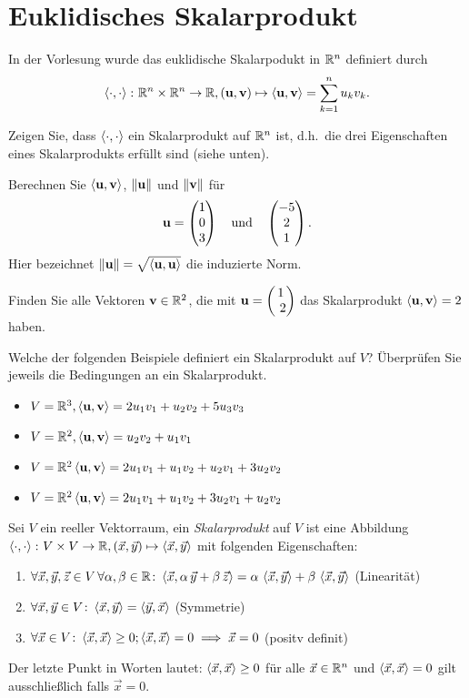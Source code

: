 \documentclass{scrartcl}
\newcommand{\xx}{\vec x}
\newcommand{\yy}{\vec y}
\newcommand{\zz}{\vec z}
\newcommand{\uu}{\mat u}
\newcommand{\vv}{\mat v}
\begin{document}
\section{Euklidisches Skalarprodukt}
In der Vorlesung wurde das euklidische Skalarpodukt in $\RR^n$ definiert durch
\[
  \sp{\cdot}{\cdot} \colon \RR^n \times \RR^n \to \RR, (\uu, \vv) \mapsto \sp{\uu}{\vv} = \sum_{k=1}^n u_k v_k.
\]
\begin{subex}
  \item Zeigen Sie, dass $\sp{\cdot}{\cdot}$ ein Skalarprodukt auf $\RR^n$ ist, d.h.\ die drei Eigenschaften eines Skalarprodukts erfüllt sind (siehe unten).
  \item Berechnen Sie $\sp{\uu}{\vv}$, $\norm{\uu}$ und $\norm{\vv}$ für 
  \[
    \uu = \colvec{1 \\ 0 \\ 3} \quad\mbox{und}\quad \colvec{-5 \\ 2 \\ 1}.
  \]
  Hier bezeichnet $\norm{\uu} = \sqrt{\sp{\uu}{\uu}}$ die induzierte Norm.
  \item Finden Sie alle Vektoren $\vv \in \RR^2$, die mit $\uu = \colvec{1 \\ 2}$ das Skalarprodukt $\sp{\uu}{\vv} = 2$ haben.  
  \item Welche der folgenden Beispiele definiert ein Skalarprodukt auf $V$?
  Überprüfen Sie jeweils die Bedingungen an ein Skalarprodukt.
  \begin{itemize}
    \item $V = \RR^3, \sp{\uu}{\vv} = 2u_1 v_1 +u_2 v_2 +5u_3 v_3$
    \item $V = \RR^2, \sp{\uu}{\vv} = u_2 v_2 + u_1 v_1$
    \item $V =\RR^2 \sp{\uu}{\vv} = 2u_1 v_1 + u_1 v_2 + u_2 v_1 + 3u_2 v_2$
    \item $V =\RR^2 \sp{\uu}{\vv} = 2u_1 v_1 + u_1 v_2 + 3u_2 v_1 + u_2 v_2$
  \end{itemize}
\end{subex}


\begin{solution}[Defintionen]
  Sei $V$ ein reeller Vektorraum, ein \emph{Skalarprodukt} auf $V$ ist eine Abbildung $\sp{\cdot}{\cdot}\colon V \times V \to \RR, (\xx,\yy) \mapsto \sp{\xx}{\yy}$ mit folgenden Eigenschaften:
  \begin{enumerate}[label=\roman*)]
    \item $\forall \xx,\yy,\zz \in V \, \forall \alpha,\beta \in \RR\colon \sp{\xx}{\alpha \, \yy + \beta \, \zz} = \alpha\,\sp{\xx}{\yy} + \beta\,\sp{\xx}{\yy}$ (Linearität)
    \item $\forall \xx,\yy \in V\colon \sp{\xx}{\yy} = \sp{\yy}{\xx}$ (Symmetrie)
    \item $\forall \xx \in V\colon \sp{\xx}{\xx} \ge 0; \sp{\xx}{\xx} = 0 \implies \xx = 0$ (positv definit)
  \end{enumerate}   
  Der letzte Punkt in Worten lautet: $\sp{\xx}{\xx} \ge 0$ für alle $\xx \in \RR^n$ und $\sp{\xx}{\xx} = 0$ gilt ausschließlich falls $\xx = 0$.\\
\end{solution}
\end{document}
